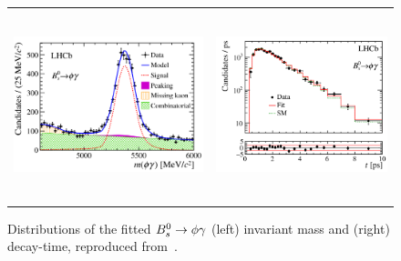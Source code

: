 \begin{figure}
  \begin{center}
    \begin{tabular}{c c}
      \includegraphics[height=5.5cm]{figs/phigammamass.png} &
      \includegraphics[height=5.5cm]{figs/phigammatime.png} 
    \end{tabular}
  \end{center}
  \vspace{-0.75cm}
  \caption{\label{phigammamasstime}Distributions of the fitted ${B}^0_s \rightarrow \phi \gamma$ (left) invariant mass and (right) decay-time, reproduced from~\cite{LHCb-PAPER-2016-034}.}
\end{figure}
